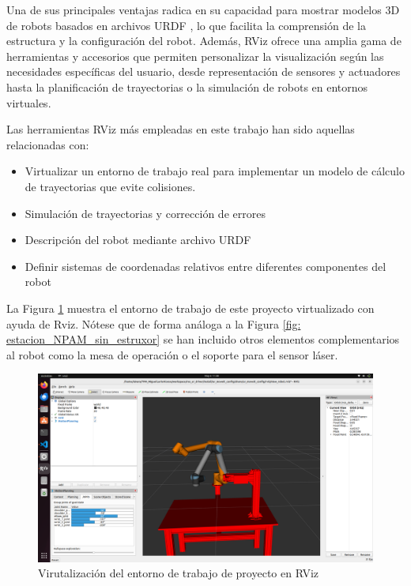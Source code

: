 Una de sus principales ventajas radica en su capacidad para mostrar modelos 3D de robots basados en archivos \acrshort{URDF} \cite{web_defincion_URDF}, lo que facilita la comprensión de la estructura y la configuración del robot. Además, RViz ofrece una amplia gama de herramientas y accesorios que permiten personalizar la visualización según las necesidades específicas del usuario, desde representación de sensores y actuadores hasta la planificación de trayectorias o la simulación de robots en entornos virtuales.

Las herramientas RViz más empleadas en este trabajo han sido aquellas relacionadas con:
\begin{itemize}
    \item Virtualizar un entorno de trabajo real para implementar un modelo de cálculo de trayectorias que evite colisiones.
    \item Simulación de trayectorias y corrección de errores
    \item Descripción del robot mediante archivo \acrshort{URDF}
    \item Definir sistemas de coordenadas relativos entre diferentes componentes del robot
\end{itemize}

La Figura \ref{fig:entorno_virtual_rviz} muestra el entorno de trabajo de este proyecto virtualizado con ayuda de Rviz. Nótese que de forma análoga a la Figura \ref{fig: estacion_NPAM_sin_estruxor} se han incluido otros elementos complementarios al robot como la mesa de operación o el soporte para el sensor láser.

\begin{figure}[h!]
    \centering
    \includegraphics[scale=0.15]{figuras/entorno_virtual_rviz.png}
    \caption{Virutalización del entorno de trabajo de proyecto en RViz}
    \label{fig:entorno_virtual_rviz}
\end{figure}

